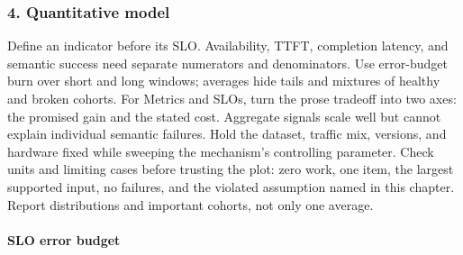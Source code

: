 \subsubsection*{4. Quantitative model}
Define an indicator before its SLO. Availability, TTFT, completion latency, and semantic success need separate numerators and denominators. Use error-budget burn over short and long windows; averages hide tails and mixtures of healthy and broken cohorts.
For Metrics and SLOs, turn the prose tradeoff into two axes: the promised gain and the stated cost. Aggregate signals scale well but cannot explain individual semantic failures. Hold the dataset, traffic mix, versions, and hardware fixed while sweeping the mechanism's controlling parameter.
Check units and limiting cases before trusting the plot: zero work, one item, the largest supported input, no failures, and the violated assumption named in this chapter. Report distributions and important cohorts, not only one average.
\paragraph{SLO error budget}
